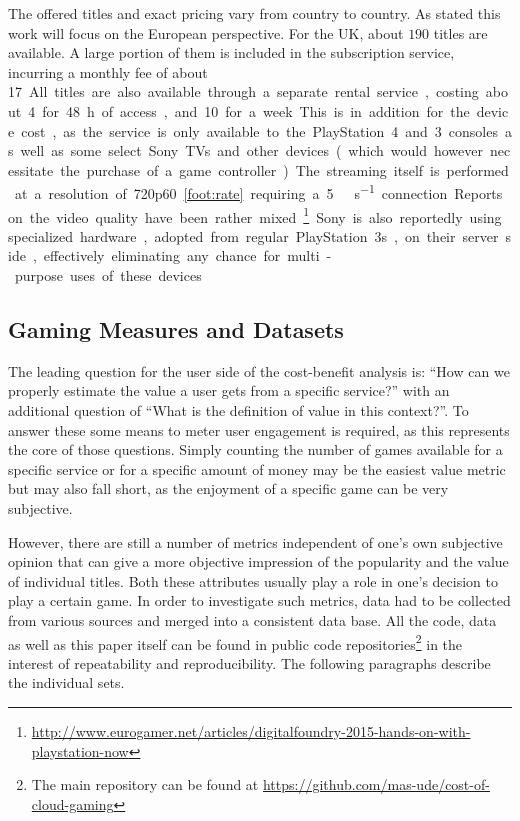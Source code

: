 The offered titles and exact pricing vary from country to country. As stated this work will focus on the European perspective. For the UK, about $190$ titles are available. A large portion of them is included in the subscription service, incurring a monthly fee of about \SI{17}[\EUR]. All titles are also available through a separate rental service, costing about \SI{4}[\EUR] for \SI{48}{\hour} of access, and \SI{10}[\EUR] for a week. This is in addition for the device cost, as the service is only available to the PlayStation 4 and 3 consoles as well as some select Sony TVs and other devices (which would however necessitate the purchase of a game controller).

The streaming itself is performed at a resolution of 720p60\cref{foot:rate} requiring a \SI{5}{\mega\bit\per\second} connection. Reports on the video quality have been rather mixed.\footnote{\url{http://www.eurogamer.net/articles/digitalfoundry-2015-hands-on-with-playstation-now}} Sony is also reportedly using specialized hardware, adopted from regular PlayStation 3s, on their server side, effectively eliminating any chance for multi-purpose uses of these devices.





\subsection{Gaming Measures and Datasets}

The leading question for the user side of the cost-benefit analysis is: ``How can we properly estimate the value a user gets from a specific service?'' with an additional question of ``What is the definition of value in this context?''. To answer these some means to meter user engagement is required, as this represents the core of those questions. Simply counting the number of games available for a specific service or for a specific amount of money may be the easiest value metric but may also fall short, as the enjoyment of a specific game can be very subjective.

However, there are still a number of metrics independent of one's own subjective opinion that can give a more objective impression of the popularity and the value of individual titles. Both these attributes usually play a role in one's decision to play a certain game. In order to investigate such metrics, data had to be collected from various sources and merged into a consistent data base. All the code, data as well as this paper itself can be found in public code repositories\footnote{The main repository can be found at \url{https://github.com/mas-ude/cost-of-cloud-gaming}} in the interest of repeatability and reproducibility. The following paragraphs describe the individual sets.

